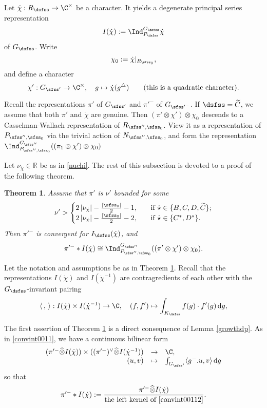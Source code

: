 \documentclass[12pt,a4paper]{amsart}
\def\abs#1{\left|{#1}\right|}
\newcommand{\od}{\operatorname{d}}
\newcommand{\R}{\mathbb R}
\newcommand{\la}{\langle}
\newcommand{\ra}{\rangle}
\newcommand{\be}{\begin {equation}}
\newcommand{\ee}{\end {equation}}
\numberwithin{equation}{section}
\newtheorem{thm}{Theorem}[section]
\theoremstyle{remark}
\begin{document}
Let $\dot \chi: R_{\dsfss}\rightarrow \C^\times $ be a character. It yields a degenerate principal series representation 
\[
I(\dot \chi):=\Ind_{P_\dsfss}^{G_\dsfss} \dot \chi
\]
 of $G_\dsfss$. 
Write
\be\label{chi0}
  \chi_0:=\dot \chi|_{R_{\sfss_0}},
\ee
and define a character 
\be\label{chip}
 \chi':  G_{\sfss'}\rightarrow \C^\times, \quad g\mapsto \dot \chi(g^\triangle) \qquad(\textrm{this is a quadratic character}).
\ee

Recall the representations  $\pi'$  of $G_{\sfss'}$ and 
$\pi'^-$ of $G_{\sfss'^-}$. If $\dsfss=\widetilde C$, we assume that both $\pi'$ and $\dot \chi$ are genuine.  Then $(\pi'\otimes \chi') \otimes \chi_0$ descends to a Casselman-Wallach representation of $R_{\sfss'',\sfss_0}$. View it as a representation of $P_{\sfss'',\sfss_0}$ via the trivial action of $N_{\sfss'',\sfss_0}$, and form the representation  $\Ind_{P_{\sfss'',\sfss_0}}^{G_{\sfss''}} ((\pi_1\otimes \chi') \otimes \chi_0)$


Let $\nu_{\dot \chi}\in \R$ be  as in \eqref{nuchi}. The rest of this subsection is devoted to a proof of the following theorem.

\begin{thm}\label{midp}
Assume that $\pi'$ is $\nu'$ bounded for some
\[
 \nu'>\begin{cases}
  2\abs{\nu_{\dot \chi}}- \frac{\abs{\sfss_0}}{2}-1,\quad &\textrm{if $\dot \star\in \{B,C,D, \widetilde C\}$};\\
   2\abs{\nu_{\dot \chi}}- \frac{\abs{\sfss_0}}{2}-2,\quad & \textrm{if $\dot \star\in \{C^*,D^*\}$}.
 \end{cases}
\]
 Then $\pi'^-$ is convergent for $I_{\dsfss}(\dot \chi)$, and
\[
 \pi'^-*I(\dot \chi)\cong \Ind_{P_{\sfss'',\sfss_0}}^{G_{\sfss''}} ((\pi'\otimes \chi')\otimes \chi_0). 
\]
\end{thm}

Let the notation and assumptions be as in Theorem \ref{midp}. 
Recall that the representations   $I(\dot \chi)$ and $ I(\dot \chi^{-1})$ are contragredients of each other with the $G_\dsfss$-invariant pairing
 \[
  \la\,,\,\ra:  I(\dot \chi)\times I(\dot \chi^{-1})\rightarrow \C, \quad (f, f')\mapsto \int_{K_\dsfss} f(g) \cdot f'(g) \od\!g,
 \]
 
The first assertion of Theorem \ref{midp} is a direct consequence of Lemma \ref{growthdp}. As in \eqref{convint0011},  we have a continuous bilinear form
\be\label{convint00112}
\begin{array}{rcl}
(\pi'^- \widehat \otimes{ I(\dot \chi)})\times ((\pi'^-)^\vee \widehat \otimes I(\dot \chi^{-1}) )&\rightarrow &\C,\\
 (u,v)&\mapsto& \int_{G_{\sfss'}} \la g^-.u,v\ra \od\! g
 \end{array}
 \ee
so that 
\begin{equation}\label{thetab0}
 \pi'^-*I(\dot \chi):=\frac{\pi'^-\widehat \otimes I(\dot \chi)}{\textrm{the left kernel of \eqref{convint00112}}}.
\end{equation}
\end{document}
